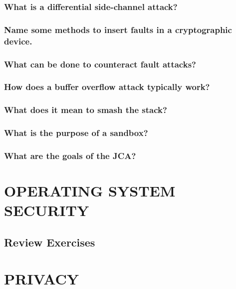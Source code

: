 \documentclass[a4paper, 10 pt, conference]{ieeeconf}
\begin{document}
\subsubsection{\textbf{What is a differential side-channel attack?}}

\subsubsection{\textbf{Name some methods to insert faults in a cryptographic device.}}

\subsubsection{\textbf{What can be done to counteract fault attacks?}}

\subsubsection{\textbf{How does a buffer overflow attack typically work?}}

\subsubsection{\textbf{What does it mean to smash the stack?}}

\subsubsection{\textbf{What is the purpose of a sandbox?}}

\subsubsection{\textbf{What are the goals of the JCA?}}



\section{\textbf{OPERATING SYSTEM SECURITY}}
\subsection{\textbf{Review Exercises}}






\section{\textbf{PRIVACY}}
\end{document}

